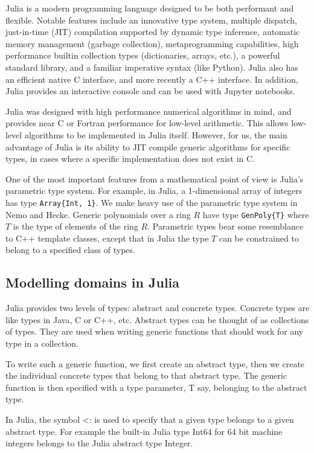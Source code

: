 \documentclass{sig-alternate-05-2015}
\begin{document}
Julia \cite{julia} is a modern programming language designed
to be both performant and flexible.
Notable features include an innovative type system,
multiple dispatch,
just-in-time (JIT) compilation
supported by dynamic type inference,
automatic memory management (garbage collection),
metaprogramming capabilities,
high performance builtin collection types (dictionaries, arrays, etc.),
a powerful standard library,
and a familiar imperative syntax (like Python).
Julia also has an efficient native C interface, and more recently a C++ interface.
In addition, Julia provides an interactive console and can be used with Jupyter notebooks.

Julia was designed with high performance numerical algorithms in mind, and provides near
C or Fortran performance for low-level arithmetic. This allows low-level algorithms to be
implemented in Julia itself. However, for us, the main advantage of Julia is its ability
to JIT compile generic algorithms for specific types, in cases where a specific
implementation does not exist in C.
 
One of the most important features from a mathematical point of view is Julia's parametric type system.
For example, in Julia, a 1-dimensional array of integers has type \texttt{Array\{Int, 1\}}.
We make heavy use of the parametric type system in Nemo and Hecke. Generic polynomials
over a ring $R$ have type \texttt{GenPoly\{T\}} where $T$ is the type of elements of the ring $R$.
Parametric types bear some resemblance to C++ template classes, except that in Julia the type $T$ can
be constrained to belong to a specified class of types.

\subsection{Modelling domains in Julia}

Julia provides two levels of types: abstract and concrete types.
Concrete types are like types in Java, C or C++,
etc. Abstract types can be thought of as collections of types. They are used when writing generic
functions that should work for any type in a collection.

To write such a generic function, we first create an abstract type, then we create the individual
concrete types that belong to that abstract type. The generic function is then specified with a type
parameter, T say, belonging to the abstract type.

In Julia, the symbol <: is used to specify that a given type belongs to a given abstract type.
For example the built-in Julia type Int64 for 64 bit machine integers belongs to the Julia
abstract type Integer.
\end{document}
